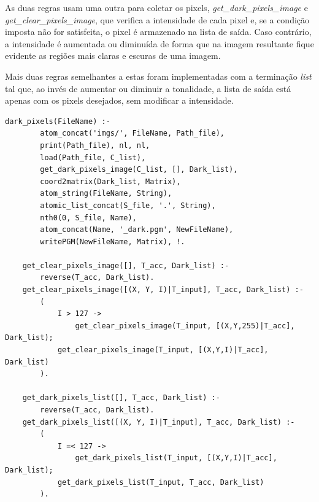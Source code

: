 \documentclass{article}
\begin{document}
        As duas regras usam uma outra para coletar os pixels, \textit{get\_dark\_pixels\_image} e \textit{get\_clear\_pixels\_image}, que verifica a intensidade de cada pixel e, se a condição imposta não for satisfeita, o pixel é armazenado na lista de saída. Caso contrário, a intensidade é aumentada ou diminuída de forma que na imagem resultante fique evidente as regiões mais claras e escuras de uma imagem.
        
        Mais duas regras semelhantes a estas foram implementadas com a terminação \textit{list} tal que, ao invés de aumentar ou diminuir a tonalidade, a lista de saída está apenas com os pixels desejados, sem modificar a intensidade.
        \begin{lstlisting}[frame=single]
    dark_pixels(FileName) :-
        atom_concat('imgs/', FileName, Path_file),
        print(Path_file), nl, nl,
        load(Path_file, C_list),
        get_dark_pixels_image(C_list, [], Dark_list),
        coord2matrix(Dark_list, Matrix),
        atom_string(FileName, String),
        atomic_list_concat(S_file, '.', String),
        nth0(0, S_file, Name),
        atom_concat(Name, '_dark.pgm', NewFileName),
        writePGM(NewFileName, Matrix), !.
    
    get_clear_pixels_image([], T_acc, Dark_list) :-
        reverse(T_acc, Dark_list).
    get_clear_pixels_image([(X, Y, I)|T_input], T_acc, Dark_list) :-
        (
            I > 127 ->
                get_clear_pixels_image(T_input, [(X,Y,255)|T_acc], Dark_list);
            get_clear_pixels_image(T_input, [(X,Y,I)|T_acc], Dark_list)
        ).
        
    get_dark_pixels_list([], T_acc, Dark_list) :-
        reverse(T_acc, Dark_list).
    get_dark_pixels_list([(X, Y, I)|T_input], T_acc, Dark_list) :-
        (
            I =< 127 ->
                get_dark_pixels_list(T_input, [(X,Y,I)|T_acc], Dark_list);
            get_dark_pixels_list(T_input, T_acc, Dark_list)
        ).
        \end{lstlisting}
\end{document}
